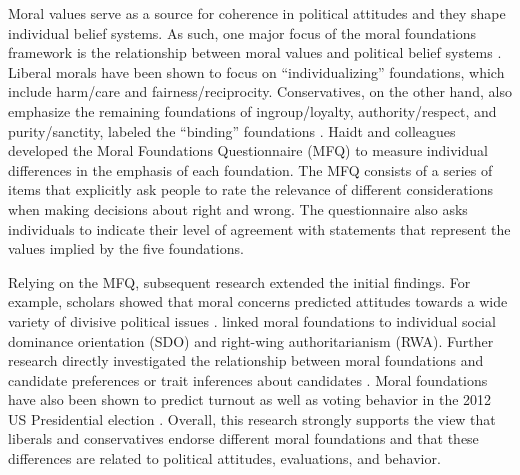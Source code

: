 \documentclass[12pt]{article}
\begin{document}
Moral values serve as a source for coherence in political attitudes and they shape individual belief systems. As such, one major focus of the moral foundations framework is the relationship between moral values and political belief systems \citep[c.f.,][]{haidt2012righteous}. Liberal morals have been shown to focus on ``individualizing'' foundations, which include harm/care and fairness/reciprocity. Conservatives, on the other hand, also emphasize the remaining foundations of ingroup/loyalty, authority/respect, and purity/sanctity, labeled the ``binding'' foundations \citep{haidt2007morality,graham2009liberals}. Haidt and colleagues developed the Moral Foundations Questionnaire (MFQ) to measure individual differences in the emphasis of each foundation. The MFQ consists of a series of items that explicitly ask people to rate the relevance of different considerations when making decisions about right and wrong. The questionnaire also asks individuals to indicate their level of agreement with statements that represent the values implied by the five foundations.

Relying on the MFQ, subsequent research extended the initial findings. For example, scholars showed that moral concerns predicted attitudes towards a wide variety of divisive political issues \citep[e.g.][]{koleva2012tracing,kertzer2014moral,low2015moral}. \citet{federico2013mapping} linked moral foundations to individual social dominance orientation (SDO) and right-wing authoritarianism (RWA). Further research directly investigated the relationship between moral foundations and candidate preferences \citep{iyer2010beyond} or trait inferences about candidates \citep{clifford2014linking}. Moral foundations have also been shown to predict turnout \citep{johnson2014ideology} as well as voting behavior in the 2012 US Presidential election \citep{franks2015using}. Overall, this research strongly supports the view that liberals and conservatives endorse different moral foundations and that these differences are related to political attitudes, evaluations, and behavior.
\end{document}
